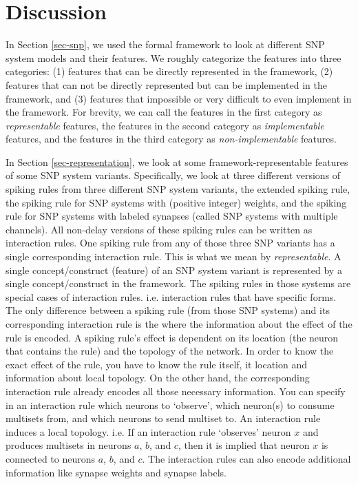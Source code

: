 \documentclass[a4paper]{article}
\theoremstyle{definition}
\begin{document}


\section{Discussion}

In Section \ref{sec-snp}, we used the formal framework to look at different SNP system models and
their features. We roughly categorize the features into three categories: (1) features that can be
directly represented in the framework, (2) features that can not be directly represented but can be
implemented in the framework, and (3) features that impossible or very difficult to even implement
in the framework. For brevity, we can call the features in the first category as 
\emph{representable} features, the features in the second category as \emph{implementable} features, 
and the features in the third category as \emph{non-implementable} features. 

In Section \ref{sec-representation}, we look at some framework-representable features of some
SNP system variants. Specifically, we look at three different versions of spiking rules from three
different SNP system variants, the extended spiking rule, the spiking rule for SNP systems with
(positive integer) weights, and the spiking rule for SNP systems with labeled synapses (called SNP
systems with multiple channels). All non-delay versions of these spiking rules can be written as
interaction rules. One spiking rule from any of those three SNP variants has a single corresponding
interaction rule. This is what we mean by \emph{representable}. A single concept/construct (feature)
of an SNP system variant is represented by a single concept/construct in the framework. The spiking
rules in those systems are special cases of interaction rules. i.e. interaction rules that have
specific forms. The only difference between a spiking rule (from those SNP systems) and its
corresponding interaction rule is the where the information about the effect of the rule is encoded.
A spiking rule's effect is dependent on its location (the neuron that contains the rule) and the
topology of the network. In order to know the exact effect of the rule, you have to know the rule
itself, it location and information about local topology. On the other hand, the corresponding 
interaction rule already encodes all those necessary information. You can specify in an interaction
rule which neurons to `observe', which neuron(s) to consume multisets from, and which neurons to
send multiset to. An interaction rule induces a local topology. i.e. If an interaction rule 
`observes' neuron $x$ and produces multisets in neurons $a$, $b$, and $c$, then it is implied that
neuron $x$ is connected to neurons $a$, $b$, and $c$. The interaction rules can also encode 
additional information like synapse weights and synapse labels.
\end{document}
